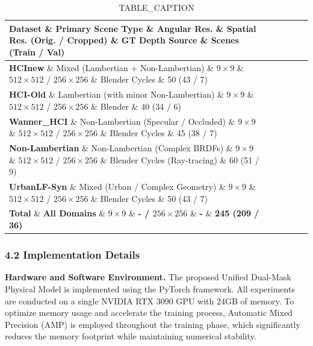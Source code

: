 \begin{table}[htbp]
\centering
\caption{TABLE_CAPTION}
\begin{tabular}{llllll}
\toprule
Dataset \& Primary Scene Type \& Angular Res. \& Spatial Res. (Orig. / Cropped) \& GT Depth Source \& Scenes (Train / Val) \\
\midrule
\textbf{HCInew} \& Mixed (Lambertian + Non-Lambertian) \& \(9 \times 9\) \& \(512 \times 512\) / \(256 \times 256\) \& Blender Cycles \& 50 (43 / 7) \\
\textbf{HCI-Old} \& Lambertian (with minor Non-Lambertian) \& \(9 \times 9\) \& \(512 \times 512\) / \(256 \times 256\) \& Blender \& 40 (34 / 6) \\
\textbf{Wanner_HCI} \& Non-Lambertian (Specular / Occluded) \& \(9 \times 9\) \& \(512 \times 512\) / \(256 \times 256\) \& Blender Cycles \& 45 (38 / 7) \\
\textbf{Non-Lambertian} \& Non-Lambertian (Complex BRDFs) \& \(9 \times 9\) \& \(512 \times 512\) / \(256 \times 256\) \& Blender Cycles (Ray-tracing) \& 60 (51 / 9) \\
\textbf{UrbanLF-Syn} \& Mixed (Urban / Complex Geometry) \& \(9 \times 9\) \& \(512 \times 512\) / \(256 \times 256\) \& Blender Cycles \& 50 (43 / 7) \\
\textbf{Total} \& \textbf{All Domains} \& \textbf{\(9 \times 9\)} \& \textbf{- / \(256 \times 256\)} \& \textbf{-} \& \textbf{245 (209 / 36)} \\
\bottomrule
\end{tabular}
\end{table}
\subsubsection{4.2 Implementation Details}

\textbf{Hardware and Software Environment.} 
The proposed Unified Dual-Mask Physical Model is implemented using the PyTorch framework. All experiments are conducted on a single NVIDIA RTX 3090 GPU with 24GB of memory. To optimize memory usage and accelerate the training process, Automatic Mixed Precision (AMP) is employed throughout the training phase, which significantly reduces the memory footprint while maintaining numerical stability.

